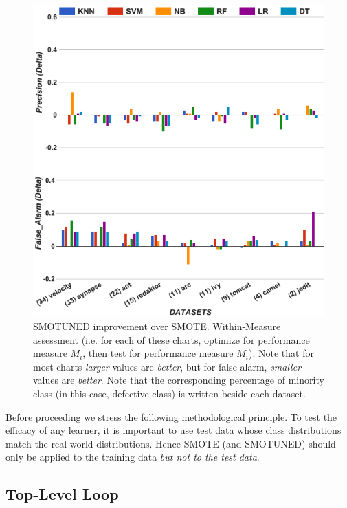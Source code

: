 \documentclass[10pt,conference]{IEEEtran}
\theoremstyle{break}
\theoremstyle{break}
\newcommand{\sma}{{\sc SMOTE}}
\newcommand{\smb}{{\sc SMOTUNED}}
\begin{document}
\begin{figure}[!t]
\begin{minipage}{.5\linewidth}
        \includegraphics[width=.95\linewidth]{./fig/prec_pf_tuned.png}
    \end{minipage}%
    
    \caption{SMOTUNED improvement over SMOTE. \underline{Within}-Measure
    assessment (i.e. for each of these charts,
    optimize for performance measure $M_i$, then test for
    performance measure $M_i$). Note that for most charts
    {\em larger} values are {\em better}, but for false alarm,
    {\em smaller} values are {\em better}. Note that the corresponding percentage of minority class (in this case, defective class) is written beside each dataset.}
    \label{fig:tuned}
\vspace{-0.5cm}
\end{figure}


Before proceeding 
we   stress the following methodological
principle.
To test the efficacy of any learner, it is important to
use test data whose class distributions match the real-world distributions.
Hence {\sma} (and {\smb}) should only
be applied to the training data {\em but
not to the test data}.



\subsection{Top-Level Loop}
\end{document}
